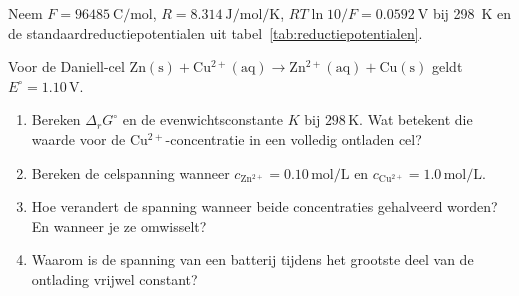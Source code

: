 
Neem $F = \SI{96485}{\coulomb\per\mole}$, $R = \SI{8.314}{\joule\per\mole\per\kelvin}$, $RT\ln 10/F = \SI{0.0592}{\volt}$ bij \SI{298}{\kelvin} en de standaardreductiepotentialen uit tabel~\ref{tab:reductiepotentialen}.

\begin{oefening}
Voor de Daniell-cel \(\mathrm{Zn(s) + Cu^{2+}(aq) \rightarrow Zn^{2+}(aq) + Cu(s)}\) geldt \(E^\circ = 1.10\,\mathrm{V}\).

\begin{enumerate}
\item[(a)]
  Bereken \(\Delta_r G^\circ\) en de evenwichtsconstante \(K\) bij \(298\,\mathrm{K}\). Wat betekent die waarde voor de \(\mathrm{Cu^{2+}}\)-concentratie in een volledig ontladen cel?
\item[(b)]
  Bereken de celspanning wanneer \(c_{\mathrm{Zn^{2+}}} = 0.10\,\mathrm{mol/L}\) en \(c_{\mathrm{Cu^{2+}}} = 1.0\,\mathrm{mol/L}\).
\item[(c)]
  Hoe verandert de spanning wanneer beide concentraties gehalveerd worden? En wanneer je ze omwisselt?
\item[(d)]
  Waarom is de spanning van een batterij tijdens het grootste deel van de ontlading vrijwel constant?
\end{enumerate}
\end{oefening}
